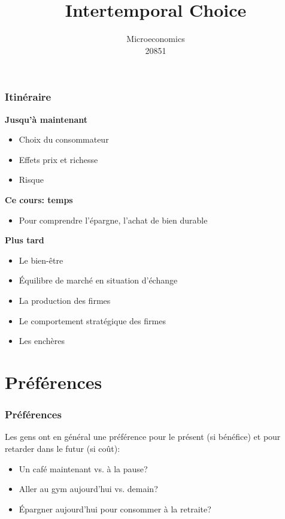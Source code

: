 \documentclass[handout]{beamer}
\title{Intertemporal Choice}
\author{Microeconomics \\ 20851}
\date{}
\newenvironment{iPar}[1]{\textbf{#1} \begin{itemize}}{\end{itemize}}
\newcommand{\mdp}{\medskip \pause}
\begin{document}
\frame{\titlepage}

\section[Outline]{}
\frame{\tableofcontents}

\section{}


\begin{frame}\frametitle{Itinéraire}

\begin{iPar}{Jusqu'à maintenant}
\item Choix du consommateur
\item Effets prix et richesse
\item Risque 
\end{iPar}\mdp

\begin{iPar}{Ce cours: temps}
\item Pour comprendre l'épargne, l'achat de bien durable
\end{iPar}\mdp

\begin{iPar}{Plus tard}
\item  Le bien-être
\item  Équilibre de marché en situation d'échange
\item  La production des firmes
\item Le comportement stratégique des firmes
\item Les enchères
\end{iPar}

\end{frame}

\section{Préférences}

\begin{frame}\frametitle{Préférences}

Les gens ont en général une préférence pour le présent (si bénéfice) et pour retarder dans le futur (si coût):

\begin{itemize}
\item Un café maintenant vs. à la pause?
\item Aller au gym aujourd'hui vs. demain?
\item Épargner aujourd'hui pour consommer à la retraite?
\end{itemize}

\end{frame}
\end{document}
